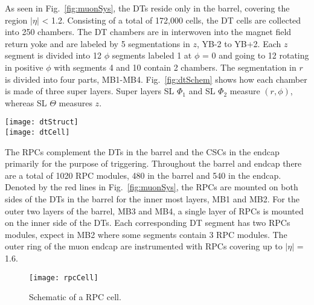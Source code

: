     As seen in Fig.~\ref{fig:muonSys}, the DTs reside only in the barrel, 
      covering the region $|\eta|$ < 1.2.
    Consisting of a total of 172,000 cells, the DT cells are collected into
      250 chambers. 
    The DT chambers are in interwoven into the magnet field return yoke and are
      labeled by 5 segmentations in $z$, YB-2 to YB+2.
    Each $z$ segment is divided into 12 $\phi$ segments labeled 1 at $\phi$ = 0
      and going to 12 rotating in positive $\phi$ with segments 4 and 10 
      contain 2 chambers.
   The segmentation in $r$ is divided into four parts, MB1-MB4.
   Fig.~\ref{fig:dtSchem} shows how each chamber is made of three super layers.
   Super layers SL $\Phi_{1}$ and SL $\Phi_{2}$ measure $(r,\phi)$, whereas 
    SL $\Theta$ measures $z$.
    \begin{figure*}[!Hhbt]
      \centering
      \texttt{[image: dtStruct]} \\
      \texttt{[image: dtCell]}
      \caption{Schematic of the DT chambers and an individual DT cell.}
      \label{fig:dtSchem}
    \end{figure*}

    The RPCs complement the DTs in the barrel and the CSCs in the endcap 
      primarily for the purpose of triggering.
    Throughout the barrel and endcap there are a total of 1020 RPC modules, 480
      in the barrel and 540 in the endcap.
    Denoted by the red lines in Fig.~\ref{fig:muonSys}, the RPCs are mounted on
      both sides of the DTs in the barrel for the inner most layers, MB1 and 
      MB2.
    For the outer two layers of the barrel, MB3 and MB4, a single layer of RPCs
      is mounted on the inner side of the DTs.
    Each corresponding DT segment has two RPCs modules, expect in MB2 where 
      some segments contain 3 RPC modules. 
    The outer ring of the muon endcap are instrumented with RPCs covering up to
      $|\eta|$ = 1.6.
    \begin{figure}[!Hhbt]
      \centering
      \texttt{[image: rpcCell]}
      \caption{Schematic of a RPC cell.}
      \label{fig:rpcSchem}
    \end{figure}
 
